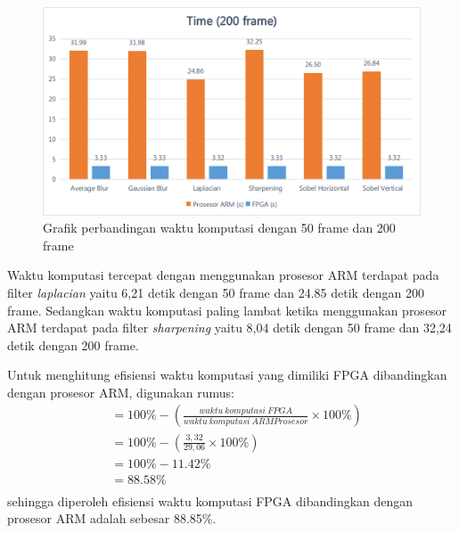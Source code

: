 \begin{figure}[ht]
    \centering
    \includegraphics[width=0.81\linewidth, center]{images/chart/chart-time200.png}
    \caption{Grafik perbandingan waktu komputasi dengan 50 frame dan 200 frame}
    \label{fig:chart-time200}
\end{figure}

Waktu komputasi tercepat dengan menggunakan prosesor ARM terdapat pada filter \textit{laplacian} yaitu 6,21 detik dengan 50 frame dan 24.85 detik dengan 200 frame. Sedangkan waktu komputasi paling lambat ketika menggunakan prosesor ARM terdapat pada filter \textit{sharpening} yaitu 8,04 detik dengan 50 frame dan 32,24 detik dengan 200 frame. 

Untuk menghitung efisiensi waktu komputasi yang dimiliki FPGA dibandingkan dengan prosesor ARM, digunakan rumus:
\begin{equation*}
    \begin{split}
& = 100\% - \left( \frac{waktu\ komputasi\ FPGA}{waktu\ komputasi\ ARM Prosesor} \times 100\% \right) \\
& = 100\% - \left( \frac{3,32}{29,06} \times 100\% \right) \\
& = 100\% - 11.42\% \\
& = 88.58\% \\
    \end{split}
\end{equation*}
sehingga diperoleh efisiensi waktu komputasi FPGA dibandingkan dengan prosesor ARM adalah sebesar 88.85\%.

